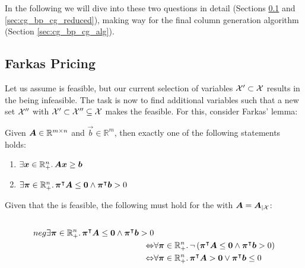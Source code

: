 In the following we will dive into these two questions in detail (Sections \ref{sec:cg_bp_cg_farkas} and \ref{sec:cg_bp_cg_reduced}), making way for the final column generation algorithm (Section \ref{sec:cg_bp_cg_alg}).

\subsection{Farkas Pricing}\label{sec:cg_bp_cg_farkas}
Let us assume \MP{} is feasible, but our current selection of variables $\mathcal{X}' \subset \mathcal{X}$ results in the \RMP{} being infeasible. The task is now to find additional variables such that a new set $\mathcal{X}''$ with $\mathcal{X}' \subset \mathcal{X}'' \subseteq \mathcal{X}$ makes the \RMP{} feasible. For this, consider Farkas' lemma:

\begin{theorem}\label{th:farkas_lemma}
Given ${\bm{A}} \in \mathbb{R}^{m \times n}$ and $\vec{b} \in \mathbb{R}^m$, then exactly one of the following statements holds:
\begin{enumerate}
	\item $\exists {\bm{x}} \in \mathbb{R}_+^n. \, {\bm{A}} {\bm{x}} \geq {\bm{b}}$
	\item $\exists {\bm{\pi}} \in \mathbb{R}_+^n. \, {\bm{\pi}}^\intercal {\bm{A}} \leq {\bm{0}} \land {\bm{\pi}}^\intercal {\bm{b}} > 0$
\end{enumerate}
\end{theorem}

Given that the \MP{} is feasible, the following must hold for the \MP{} with ${\bm{A}} = {\bm{A}}_{\vert \mathcal{X}}$:
\begin{equation}
\begin{aligned}
& \\neg \exists {\bm{\pi}} \in \mathbb{R}_+^n. \, {\bm{\pi}}^\intercal {\bm{A}} \leq {\bm{0}} \land {\bm{\pi}}^\intercal {\bm{b}} > 0 \\
\Leftrightarrow & \forall {\bm{\pi}} \in \mathbb{R}_+^n. \, \neg \left( {\bm{\pi}}^\intercal {\bm{A}} \leq {\bm{0}} \land {\bm{\pi}}^\intercal {\bm{b}} > 0 \right)\\
\Leftrightarrow & \forall {\bm{\pi}} \in \mathbb{R}_+^n. \, {\bm{\pi}}^\intercal {\bm{A}} > {\bm{0}} \lor {\bm{\pi}}^\intercal {\bm{b}} \leq 0
\end{aligned}
\end{equation}

